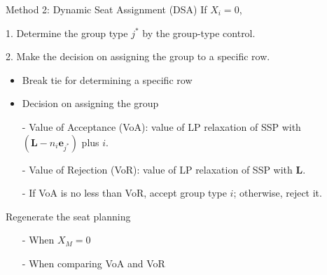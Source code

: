   
  

  
  

    


    \begin{frame}{Method 2: Dynamic Seat Assignment (DSA)}
      If $X_i = 0$,
      
      1. Determine the group type $j^{*}$ by the group-type control.

      2. Make the decision on assigning the group to a specific row.
      \begin{itemize}
        \item Break tie for determining a specific row
        \item Decision on assigning the group
        \item[-] Value of Acceptance (VoA): value of LP relaxation of SSP with $(\mathbf{L}-n_i \mathbf{e}_{j^{*}})$ plus $i$.
        

        \item[-] Value of Rejection (VoR): value of LP relaxation of SSP with $\mathbf{L}$.

        \item[-] If VoA is no less than VoR, accept group type $i$; otherwise, reject it.
      \end{itemize}
      Regenerate the seat planning
      \begin{itemize}
      \item[-] When $X_{M} =0$
      \item[-] When comparing VoA and VoR 
      \end{itemize}
    \end{frame}

